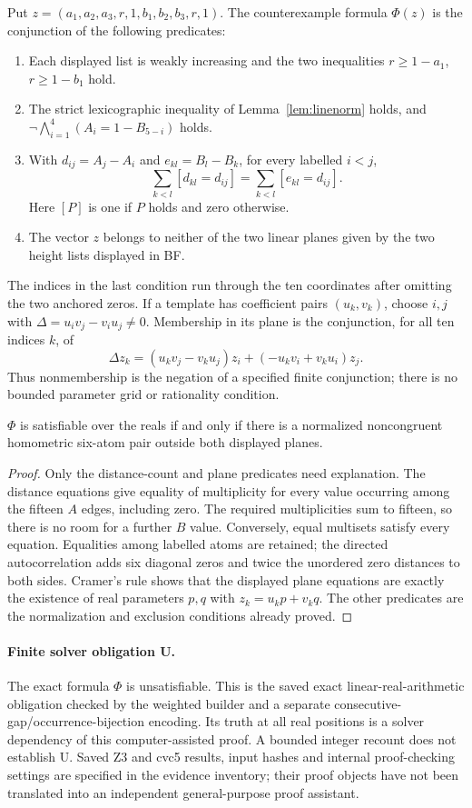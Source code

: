Put $z=(a_1,a_2,a_3,r,1,b_1,b_2,b_3,r,1)$. The counterexample formula
$\Phi(z)$ is the conjunction of the following predicates:
\begin{enumerate}
\item Each displayed list is weakly increasing and the two inequalities
$r\ge1-a_1$, $r\ge1-b_1$ hold.
\item The strict lexicographic inequality of Lemma~\ref{lem:linenorm}
holds, and
$\neg\bigwedge_{i=1}^{4}(A_i=1-B_{5-i})$ holds.
\item With $d_{ij}=A_j-A_i$ and $e_{kl}=B_l-B_k$, for every labelled
$i<j$,
\[
 \sum_{k<l}[d_{kl}=d_{ij}]
   =\sum_{k<l}[e_{kl}=d_{ij}].
\]
Here $[P]$ is one if $P$ holds and zero otherwise.
\item The vector $z$ belongs to neither of the two linear planes given
by the two height lists displayed in BF.
\end{enumerate}
The indices in the last condition run through the ten coordinates after
omitting the two anchored zeros. If a template has coefficient pairs
$(u_k,v_k)$, choose $i,j$ with $\Delta=u_iv_j-v_iu_j\ne0$. Membership
in its plane is the conjunction, for all ten indices $k$, of
\[
 \Delta z_k=(u_kv_j-v_ku_j)z_i+(-u_kv_i+v_ku_i)z_j.
\]
Thus nonmembership is the negation of a specified finite conjunction;
there is no bounded parameter grid or rationality condition.

\begin{lemma}\label{lem:lineencode}
$\Phi$ is satisfiable over the reals if and only if there is a normalized
noncongruent homometric six-atom pair outside both displayed planes.
\end{lemma}
\begin{proof}
Only the distance-count and plane predicates need explanation. The
distance equations give equality of multiplicity for every value occurring
among the fifteen $A$ edges, including zero. The required multiplicities
sum to fifteen, so there is no room for a further $B$ value. Conversely,
equal multisets satisfy every equation. Equalities among labelled atoms
are retained; the directed autocorrelation adds six diagonal zeros and
twice the unordered zero distances to both sides. Cramer's rule shows
that the displayed plane equations are exactly the existence of real
parameters $p,q$ with $z_k=u_kp+v_kq$. The other predicates are the
normalization and exclusion conditions already proved.
\end{proof}

\paragraph{Finite solver obligation U.}
The exact formula $\Phi$ is unsatisfiable. This is the saved exact
linear-real-arithmetic obligation checked by the weighted builder and
a separate consecutive-gap/occurrence-bijection encoding. Its truth at
all real positions is a solver dependency of this computer-assisted
proof. A bounded integer recount does not establish U. Saved Z3 and
cvc5 results, input hashes and internal proof-checking settings are
specified in the evidence inventory; their proof objects have not been
translated into an independent general-purpose proof assistant.

